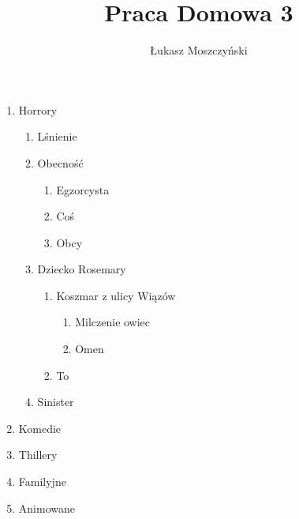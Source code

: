\documentclass[a4paper, 12pt]{amsart}
\author{Łukasz Moszczyński}
\title{Praca Domowa 3}
\begin{document}
\maketitle

\renewcommand{\labelenumi}{\Alph{enumi})}
\renewcommand{\labelenumii}{\Alph{enumi}.\alph{enumii})}
\renewcommand{\labelenumiii}{\Alph{enumi}.\alph{enumii}.\bf\Roman{enumiii})}
\renewcommand{\labelenumiv}{[\roman{enumiv}]}


\begin{enumerate}
  \item Horrory
  \begin{enumerate}
    \item Lśnienie
    \item Obecność
      \begin{enumerate}
        \item Egzorcysta
        \item Coś
        \item Obcy
      \end{enumerate}
    \item Dziecko Rosemary
      \begin{enumerate}
        \item Koszmar z ulicy Wiązów
      \begin{enumerate}
        \item Milczenie owiec
        \item Omen
      \end{enumerate}
        \item To
      \end{enumerate}
    \item Sinister
  \end{enumerate}
  \item Komedie
  \item Thillery
  \item Familyjne
  \item Animowane
\end{enumerate}
\end{document}
